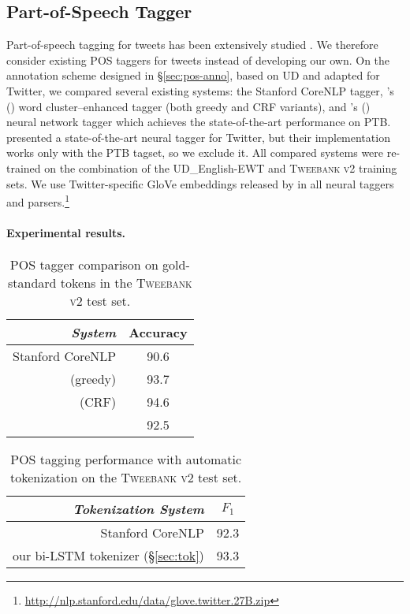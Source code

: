 \documentclass[11pt,a4paper]{article}
\newcommand{\citeposs}[2][]{\citeauthor{#2}'s (\citeyear[#1]{#2})}
\begin{document}
\subsection{Part-of-Speech Tagger}



Part-of-speech tagging for tweets has been extensively studied \cite{ritter-EtAl:2011:EMNLP,gimpel-EtAl:2011:ACL-HLT2011,derczynski-EtAl:2013:RANLP-2013,owoputi-EtAl:2013:NAACL-HLT,gui-EtAl:2017:EMNLP20172}. We therefore consider existing POS taggers for tweets instead of developing our own.
On the annotation scheme designed in \S\ref{sec:pos-anno}, based on UD and adapted for
Twitter, we compared several existing systems: the Stanford CoreNLP tagger, 
\citeposs{owoputi-EtAl:2013:NAACL-HLT} word cluster--enhanced tagger
(both greedy and CRF variants), and 
\citeposs{ma-hovy:2016:P16-1} neural network tagger 
which achieves the state-of-the-art performance on PTB.
 presented a state-of-the-art neural tagger for Twitter,
but their implementation works only with the PTB tagset, so we exclude
it. All compared systems were re-trained on the combination of the UD\_English-EWT and 
\textsc{Tweebank v2} training sets. We use Twitter-specific GloVe embeddings released by
\citet{pennington-socher-manning:2014:EMNLP2014} in all neural taggers
and parsers.\footnote{\url{http://nlp.stanford.edu/data/glove.twitter.27B.zip}}


\paragraph{Experimental results.}

\begin{table}[t]
	\centering
	\begin{tabular}{rc}
\it System & Accuracy \\
		\hline
Stanford CoreNLP & 90.6 \\
\citealp{owoputi-EtAl:2013:NAACL-HLT} (greedy) & 93.7 \\
		\citealp{owoputi-EtAl:2013:NAACL-HLT} (CRF) & 94.6 \\
		\hdashline
\citealp{ma-hovy:2016:P16-1} & 92.5 \\
\end{tabular}
	\caption{POS tagger comparison on gold-standard tokens in the
          \textsc{Tweebank v2} test set.\label{tbl:pos-result}}
\end{table}

\begin{table}[t]
	\centering
	\begin{tabular}{rc}
\it Tokenization System & $F_1$ \\
		\hline
		Stanford CoreNLP & 92.3 \\
		our bi-LSTM tokenizer (\S\ref{sec:tok}) & 93.3 \\
\end{tabular}
	\caption{\citet{owoputi-EtAl:2013:NAACL-HLT} POS tagging performance with automatic tokenization on
          the \textsc{Tweebank v2} test set. \label{tbl:pos-result-vs-tok}}
\end{table}
\end{document}
